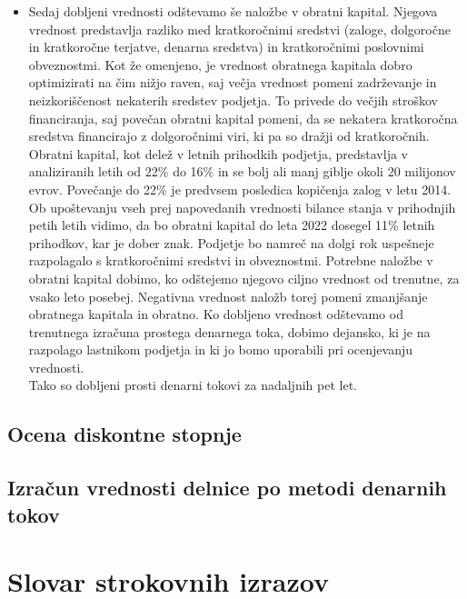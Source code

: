 \documentclass[12pt,a4paper]{amsart}
\theoremstyle{definition} %
\theoremstyle{plain} %
\newcommand{\geslo}[2]{\noindent\textbf{#1}\hspace*{3mm}\hangindent=\parindent\hangafter=1 #2}
\begin{document}
\begin{itemize}
\item Sedaj dobljeni vrednosti odštevamo še naložbe v obratni kapital. Njegova vrednost predstavlja razliko med kratkoročnimi sredstvi (zaloge, dolgoročne in kratkoročne terjatve, denarna sredstva) in kratkoročnimi poslovnimi obveznostmi. Kot že omenjeno, je vrednost obratnega kapitala dobro optimizirati na čim nižjo raven, saj večja vrednost pomeni zadrževanje in neizkoriščenost nekaterih sredstev podjetja. To privede do večjih stroškov financiranja, saj povečan obratni kapital pomeni, da se nekatera kratkoročna sredstva financirajo z dolgoročnimi viri, ki pa so dražji od kratkoročnih. Obratni kapital, kot delež v letnih prihodkih podjetja, predstavlja v analiziranih letih od 22\% do 16\% in se bolj ali manj giblje okoli 20 milijonov evrov.  Povečanje do 22\% je predvsem posledica kopičenja zalog v letu 2014. Ob upoštevanju vseh prej napovedanih vrednosti bilance stanja v prihodnjih petih letih vidimo, da bo obratni kapital do leta 2022 dosegel 11\% letnih prihodkov, kar je dober znak. Podjetje bo namreč na dolgi rok uspešneje razpolagalo s kratkoročnimi sredstvi in obveznostmi. Potrebne naložbe v obratni kapital dobimo, ko odštejemo njegovo ciljno vrednost od trenutne, za vsako leto posebej. Negativna vrednost naložb torej pomeni zmanjšanje obratnega kapitala in obratno. Ko dobljeno vrednost odštevamo od trenutnega izračuna prostega denarnega toka, dobimo dejansko, ki je na razpolago lastnikom podjetja in ki jo bomo uporabili pri ocenjevanju vrednosti.\\
Tako so dobljeni prosti denarni tokovi za nadaljnih pet let. 
\end{itemize}


\subsection{Ocena diskontne stopnje}

  



\subsection{Izračun vrednosti delnice po metodi denarnih tokov}



\section*{Slovar strokovnih izrazov}

%
%


\begin{thebibliography}{99}




\end{thebibliography}
\end{document}
